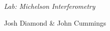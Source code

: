 {\LARGE {\em \noindent Lab: Michelson Interferometry}} 

\large{\noindent Josh Diamond \& John Cummings}



